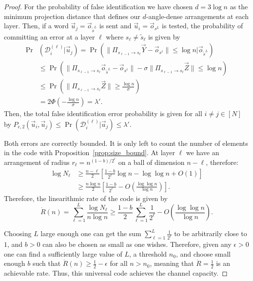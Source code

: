 \documentclass[10pt,conference]{IEEEtran}
\newcommand{\1}{\mathds{1}}
\newcommand{\cD}{\mathcal{D}}
\begin{document}
\begin{proof}
For the probability of false identification we have chosen $d=3\log n$ as the minimum projection distance that defines our $d$-angle-dense arrangements at each layer. Then, if a word $\vec u_j=\vec{o}_{\tilde{s}^{L}}$ is sent and $\vec{u}_i=\vec{o}_{s^{L}}$ is tested, the probability of committing an error at a layer $\ell$ where $s_\ell\neq\tilde{s}_\ell$ is given by
\begin{equation}\label{eq:uni_layer_error2}
\begin{split}
\!\!\!\!\Pr&(\cD_i^{(\ell)}|\vec{u}_j)=\Pr\left(\|\Pi_{s_{\ell-1}\to s_{\ell}}\vec{Y}-\vec{o}_{s^\ell}\|\leq\log n|\vec{o}_{\tilde{s}^{L}}\right)\\
&\leq\Pr\left(\|\Pi_{s_{\ell-1}\to s_{\ell}}\vec{o}_{\tilde{s}^{L}}-\vec{o}_{s^\ell}\|\!-\!\sigma\|\Pi_{s_{\ell-1}\to s_{\ell}}\vec{Z}\|\!\leq\!\log n\right)\\
&\leq\Pr\left(\|\Pi_{s_{\ell-1}\to s_{\ell}}\vec{Z}\|\geq\frac{\log n}{\sigma}\right)\\
&=2\Phi\left(-\frac{\log n}{\sigma}\right)=\lambda'.
\end{split}
\end{equation}
Then, the total false identification error probability is given for all $i\neq j\in[N]$ by 
\(
P_{e,2}(\vec{u}_i,\vec{u}_j)\leq\Pr\left(\cD_i^{(\ell)}|\vec{u}_j\right)\leq\lambda'.
\)

Both errors are correctly bounded. It is only left to count the number of elements in the code with Proposition~\ref{prop:size_bound}. At layer $\ell$ we have an arrangement of radius $r_\ell=n^{(1-b)/2^{\ell}}$ on a ball of dimension $n-\ell$, therefore:
\begin{equation}
\begin{split}
\log N_\ell &\geq\frac{n-\ell}{2}\left[\frac{1-b}{2^\ell}\log n-\log\log n+O(1)\right]\\
&\geq\frac{n\log n}{2}\left[\frac{1-b}{2^\ell}-O\left(\frac{\log \log n}{\log n}\right)\right].
\end{split}
\end{equation}
Therefore, the linearithmic rate of the code is given by 
\begin{equation}\label{eq:uni_rate}
\dot R(n)=\sum_{\ell=1}^{L}\frac{\log N_\ell}{n\log n}
\geq\frac{1-b}{2}\sum_{\ell=1}^{L}\frac{1}{2^\ell}-O\left(\frac{\log\log n}{\log n}\right).
\end{equation}

Choosing $L$ large enough one can get the sum $\sum_{\ell=1}^{L}\frac{1}{2^\ell}$ to be arbitrarily close to $1$, and $b>0$ can also be chosen as small as one wishes. Therefore, given any $\epsilon>0$ one can find a sufficiently large value of $L$, a threshold $n_0$, and choose small enough $b$ such that $\dot R(n)\geq\frac12-\epsilon$ for all $n>n_0$, meaning that $\dot R=\frac12$ is an achievable rate. Thus, this universal code achieves the channel capacity.
\end{proof}
\end{document}
